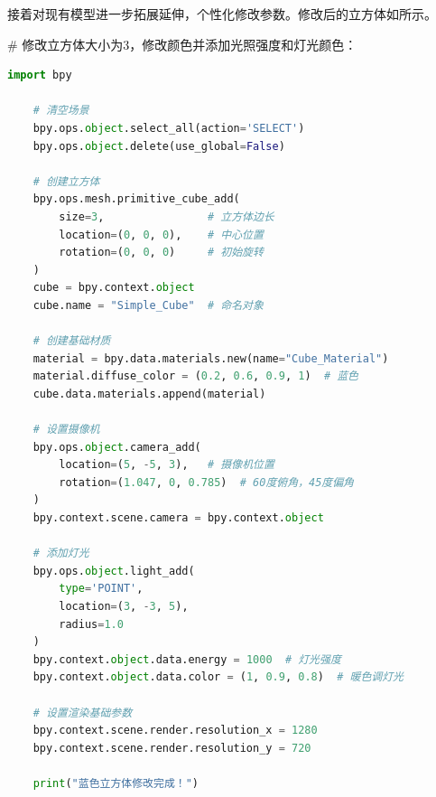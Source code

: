 
接着对现有模型进一步拓展延伸，个性化修改参数。修改后的立方体如所示。


\begin{gptbox} 
\footnotesize{\# 修改立方体大小为3，修改颜色并添加光照强度和灯光颜色：}
\small{
\begin{lstlisting}[language=Python]
    import bpy
    
    # 清空场景
    bpy.ops.object.select_all(action='SELECT')
    bpy.ops.object.delete(use_global=False)
    
    # 创建立方体
    bpy.ops.mesh.primitive_cube_add(
        size=3,                # 立方体边长
        location=(0, 0, 0),    # 中心位置
        rotation=(0, 0, 0)     # 初始旋转
    )
    cube = bpy.context.object
    cube.name = "Simple_Cube"  # 命名对象
    
    # 创建基础材质
    material = bpy.data.materials.new(name="Cube_Material")
    material.diffuse_color = (0.2, 0.6, 0.9, 1)  # 蓝色
    cube.data.materials.append(material)
    
    # 设置摄像机
    bpy.ops.object.camera_add(
        location=(5, -5, 3),   # 摄像机位置
        rotation=(1.047, 0, 0.785)  # 60度俯角，45度偏角
    )
    bpy.context.scene.camera = bpy.context.object
    
    # 添加灯光
    bpy.ops.object.light_add(
        type='POINT',
        location=(3, -3, 5),
        radius=1.0
    )
    bpy.context.object.data.energy = 1000  # 灯光强度
    bpy.context.object.data.color = (1, 0.9, 0.8)  # 暖色调灯光
    
    # 设置渲染基础参数
    bpy.context.scene.render.resolution_x = 1280
    bpy.context.scene.render.resolution_y = 720
    
    print("蓝色立方体修改完成！")

\end{lstlisting}
} 
\end{gptbox} 


